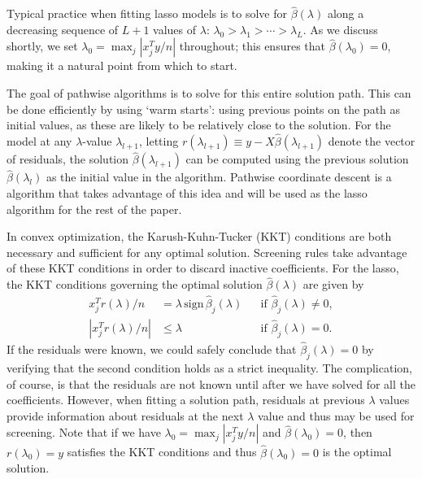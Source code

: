 \documentclass[]{interact}
\theoremstyle{plain}%
\theoremstyle{definition}
\theoremstyle{remark}
\providecommand{\sign}{\textrm{sign}}
\newcommand{\quotes}[1]{`#1'}
\begin{document}
Typical practice when fitting lasso models is to solve for $\hat{\beta}(\lambda)$ along a decreasing sequence of $L+1$ values of $\lambda$: $\lambda_0 > \lambda_1 > \cdots > \lambda_L$.  As we discuss shortly, we set $\lambda_0=\max_j|x_j^Ty/n|$ throughout; this ensures that $\hat{\beta}(\lambda_0)=0$, making it a natural point from which to start.

The goal of pathwise algorithms is to solve for this entire solution path.  This can be done efficiently by using \quotes{warm starts}: using previous points on the path as initial values, as these are likely to be relatively close to the solution.  For the model at any $\lambda$-value $\lambda_{l+1}$, letting $r(\lambda_{l+1}) \equiv y-X\hat{\beta}(\lambda_{l+1})$ denote the vector of residuals, the solution $\hat{\beta}(\lambda_{l+1})$ can be computed using the previous solution $\hat{\beta}(\lambda_l)$ as the initial value in the algorithm. Pathwise coordinate descent is a algorithm that takes advantage of this idea and will be used as the lasso algorithm for the rest of the paper.

In convex optimization, the Karush-Kuhn-Tucker (KKT) conditions are both necessary and sufficient for any optimal solution.  Screening rules take advantage of these KKT conditions in order to discard inactive coefficients.  For the lasso, the KKT conditions governing the optimal solution $\hat{\beta}(\lambda)$ are given by
\begin{equation}
  \label{eq:kkt}
  \begin{aligned}
    x_j^Tr(\lambda)/n &= \lambda \, \sign \, \hat{\beta}_j(\lambda) & & \textrm{if } \hat{\beta}_j(\lambda)\neq 0,\\
    |x_j^Tr(\lambda)/n| &\leq \lambda & & \textrm{if } \hat{\beta}_j(\lambda)= 0.
  \end{aligned}
\end{equation}
If the residuals were known, we could safely conclude that $\hat{\beta}_j(\lambda)=0$ by verifying that the second condition holds as a strict inequality.  The complication, of course, is that the residuals are not known until after we have solved for all the coefficients.  However, when fitting a solution path, residuals at previous $\lambda$ values provide information about residuals at the next $\lambda$ value and thus may be used for screening. Note that if we have $\lambda_0=\max_j|x_j^Ty/n|$ and $\hat{\beta}(\lambda_0)=0$, then $r(\lambda_0)=y$ satisfies the KKT conditions and thus $\hat{\beta}(\lambda_0)=0$ is the optimal solution.
\end{document}
